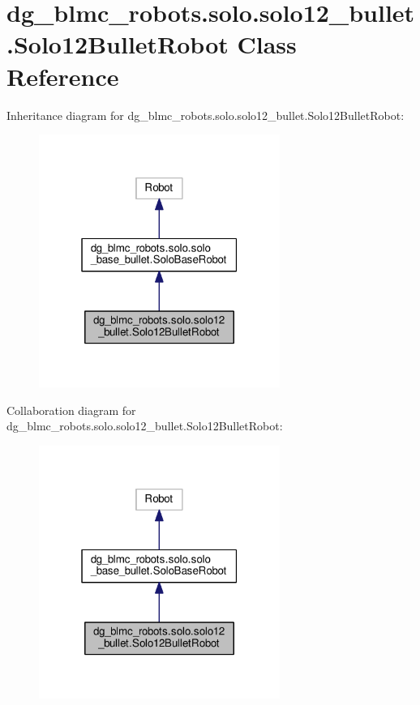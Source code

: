 \hypertarget{classdg__blmc__robots_1_1solo_1_1solo12__bullet_1_1Solo12BulletRobot}{}\section{dg\+\_\+blmc\+\_\+robots.\+solo.\+solo12\+\_\+bullet.\+Solo12\+Bullet\+Robot Class Reference}
\label{classdg__blmc__robots_1_1solo_1_1solo12__bullet_1_1Solo12BulletRobot}


Inheritance diagram for dg\+\_\+blmc\+\_\+robots.\+solo.\+solo12\+\_\+bullet.\+Solo12\+Bullet\+Robot\+:
\nopagebreak
\begin{figure}[H]
\begin{center}
\leavevmode
\includegraphics[width=223pt]{classdg__blmc__robots_1_1solo_1_1solo12__bullet_1_1Solo12BulletRobot__inherit__graph}
\end{center}
\end{figure}


Collaboration diagram for dg\+\_\+blmc\+\_\+robots.\+solo.\+solo12\+\_\+bullet.\+Solo12\+Bullet\+Robot\+:
\nopagebreak
\begin{figure}[H]
\begin{center}
\leavevmode
\includegraphics[width=223pt]{classdg__blmc__robots_1_1solo_1_1solo12__bullet_1_1Solo12BulletRobot__coll__graph}
\end{center}
\end{figure}
